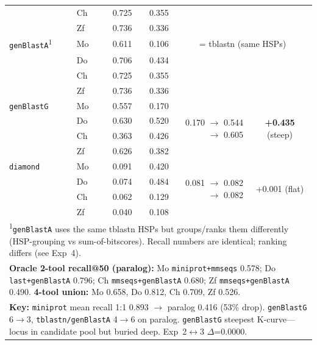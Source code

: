 \begin{table}[!t]
\begin{tabular}{llrrrc}
 & Ch & 0.725 & 0.355 & & \\
 & Zf & 0.736 & 0.336 & & \\
\midrule
\texttt{genBlastA}\textsuperscript{1} & Mo & 0.611 & 0.106 & \multicolumn{2}{c}{= tblastn (same HSPs)} \\
 & Do & 0.706 & 0.434 & & \\
 & Ch & 0.725 & 0.355 & & \\
 & Zf & 0.736 & 0.336 & & \\
\midrule
\texttt{genBlastG} & Mo & 0.557 & 0.170 & \multirow{4}{*}{0.170 $\rightarrow$ 0.544 $\rightarrow$ 0.605} & \multirow{4}{*}{\textbf{+0.435} (steep)} \\
 & Do & 0.630 & 0.520 & & \\
 & Ch & 0.363 & 0.426 & & \\
 & Zf & 0.626 & 0.382 & & \\
\midrule
\texttt{diamond} & Mo & 0.091 & 0.420 & \multirow{4}{*}{0.081 $\rightarrow$ 0.082 $\rightarrow$ 0.082} & \multirow{4}{*}{+0.001 (flat)} \\
 & Do & 0.074 & 0.484 & & \\
 & Ch & 0.062 & 0.129 & & \\
 & Zf & 0.040 & 0.108 & & \\
\bottomrule
\multicolumn{6}{l}{\textsuperscript{1}\texttt{genBlastA} uses the same tblastn HSPs but groups/ranks them differently (HSP-grouping vs sum-of-bitscores). Recall numbers are identical; ranking differs (see Exp~4).} \\
\multicolumn{6}{l}{\textbf{Oracle 2-tool recall@50 (paralog):} Mo \texttt{miniprot+mmseqs} 0.578; Do \texttt{last+genBlastA} 0.796; Ch \texttt{mmseqs+genBlastA} 0.680; Zf \texttt{mmseqs+genBlastA} 0.490. \textbf{4-tool union:} Mo 0.658, Do 0.812, Ch 0.709, Zf 0.526.} \\
\multicolumn{6}{l}{\textbf{Key:} \texttt{miniprot} mean recall 1:1 0.893 $\rightarrow$ paralog 0.416 (53\% drop). \texttt{genBlastG} 6$\rightarrow$3, \texttt{tblastn/genBlastA} 4$\rightarrow$6 on paralog. \texttt{genBlastG} steepest K-curve---locus in candidate pool but buried deep. Exp~2$\leftrightarrow$3 $\Delta$=0.0000.} \\
\end{tabular}
\end{table}
